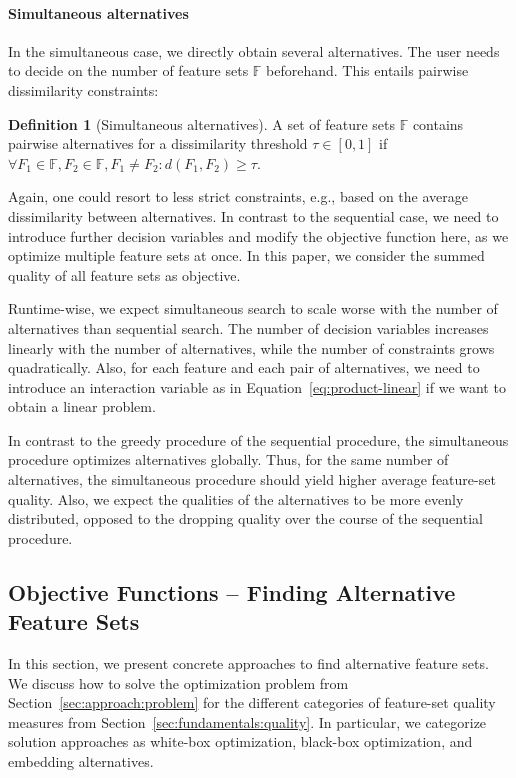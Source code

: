 \documentclass[conference]{IEEEtran}
\theoremstyle{definition}
\newtheorem{definition}{Definition}
\begin{document}
\paragraph{Simultaneous alternatives}

In the simultaneous case, we directly obtain several alternatives.
The user needs to decide on the number of feature sets $\mathbb{F}$ beforehand.
This entails pairwise dissimilarity constraints:
%
\begin{definition}[Simultaneous alternatives]
	A set of feature sets $\mathbb{F}$ contains pairwise alternatives for a dissimilarity threshold $\tau \in [0,1]$ if $\forall F_1 \in \mathbb{F}, F_2 \in \mathbb{F}, F_1 \neq F_2: d(F_1,F_2) \geq \tau$.
	\label{def:simultaneous-alternative}
\end{definition}
%
Again, one could resort to less strict constraints, e.g., based on the average dissimilarity between alternatives.
In contrast to the sequential case, we need to introduce further decision variables and modify the objective function here, as we optimize multiple feature sets at once.
In this paper, we consider the summed quality of all feature sets as objective.

Runtime-wise, we expect simultaneous search to scale worse with the number of alternatives than sequential search.
The number of decision variables increases linearly with the number of alternatives, while the number of constraints grows quadratically.
Also, for each feature and each pair of alternatives, we need to introduce an interaction variable as in Equation~\ref{eq:product-linear} if we want to obtain a linear problem.

In contrast to the greedy procedure of the sequential procedure, the simultaneous procedure optimizes alternatives globally.
Thus, for the same number of alternatives, the simultaneous procedure should yield higher average feature-set quality.
Also, we expect the qualities of the alternatives to be more evenly distributed, opposed to the dropping quality over the course of the sequential procedure.

\subsection{Objective Functions -- Finding Alternative Feature Sets}
\label{sec:approach:objectives}

In this section, we present concrete approaches to find alternative feature sets.
We discuss how to solve the optimization problem from Section~\ref{sec:approach:problem} for the different categories of feature-set quality measures from Section~\ref{sec:fundamentals:quality}.
In particular, we categorize solution approaches as white-box optimization, black-box optimization, and embedding alternatives.
\end{document}
